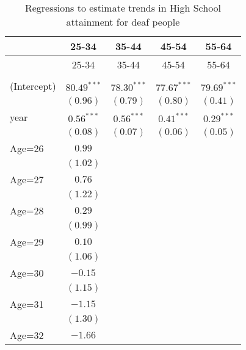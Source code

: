 \documentclass[fullpage]{paper}
\begin{document}
\begin{center}
\begin{longtable}{l c c c c }
\hline
 & 25-34 & 35-44 & 45-54 & 55-64 \\
\hline
\endfirsthead
\hline
 & 25-34 & 35-44 & 45-54 & 55-64 \\
\hline
\endhead
\hline
\endfoot
\hline
\multicolumn{5}{l}{\scriptsize{$^{***}p<0.001$, $^{**}p<0.01$, $^*p<0.05$}}\\
\caption{Regressions to estimate trends in High School attainment for deaf people}
\label{table:coefficients}
\endlastfoot
(Intercept) & $80.49^{***}$ & $78.30^{***}$ & $77.67^{***}$ & $79.69^{***}$ \\
            & $(0.96)$      & $(0.79)$      & $(0.80)$      & $(0.41)$      \\
year        & $0.56^{***}$  & $0.56^{***}$  & $0.41^{***}$  & $0.29^{***}$  \\
            & $(0.08)$      & $(0.07)$      & $(0.06)$      & $(0.05)$      \\
Age=26      & $0.99$        &               &               &               \\
            & $(1.02)$      &               &               &               \\
Age=27      & $0.76$        &               &               &               \\
            & $(1.22)$      &               &               &               \\
Age=28      & $0.29$        &               &               &               \\
            & $(0.99)$      &               &               &               \\
Age=29      & $0.10$        &               &               &               \\
            & $(1.06)$      &               &               &               \\
Age=30      & $-0.15$       &               &               &               \\
            & $(1.15)$      &               &               &               \\
Age=31      & $-1.15$       &               &               &               \\
            & $(1.30)$      &               &               &               \\
Age=32      & $-1.66$       &               &               &               \\

\end{longtable}
\end{center}
\end{document}
